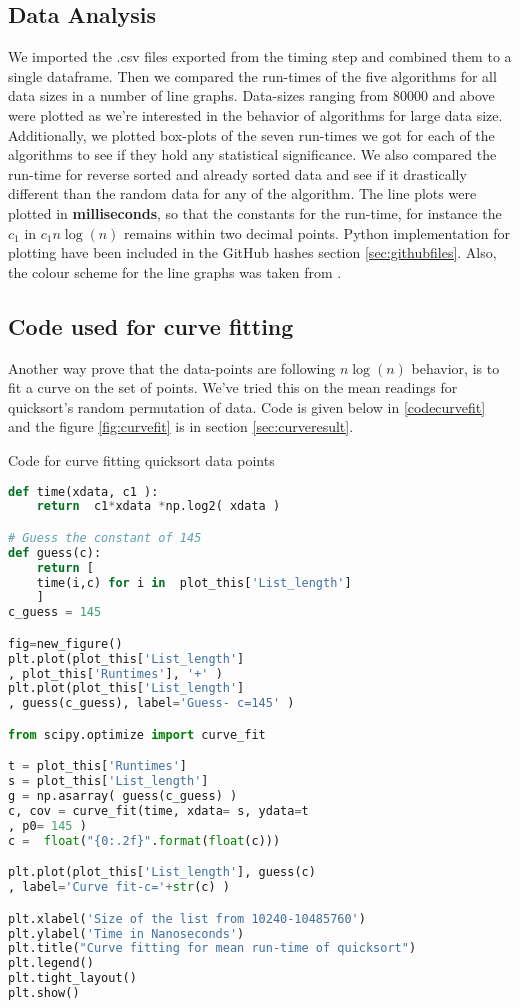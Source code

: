 \documentclass[sigconf, nonacm, natbib, screen, balance=False]{acmart}
\begin{document}
\subsection{Data Analysis}\label{sec:analysis}
We imported the .csv files exported from the timing step and combined them to a single dataframe. Then we compared the run-times of the five algorithms for all data sizes in a number of line graphs. Data-sizes ranging from 80000 and above were plotted as we're interested in the behavior of algorithms for large data size.\newline
Additionally, we plotted box-plots of the seven run-times we got for each of the algorithms to see if they hold any statistical significance. We also compared the run-time for reverse sorted and already sorted data and see if it drastically different than the random data for any of the algorithm. The line plots were plotted in \textbf{milliseconds}, so that the constants for the run-time, for instance the $c_1$ in  $c_1n\log\left(n\right)$ remains within two decimal points.\newline
Python implementation for plotting have been included in the GitHub hashes section \ref{sec:githubfiles}. Also, the colour scheme for the line graphs was taken from \citet{colorcombo}.

\subsection{Code used for curve fitting}\label{sec:curvefitting}
Another way prove that the data-points are following \textbf{$n\log(n)$} behavior, is to fit a curve on the set of points. We've tried this on the mean readings for quicksort's random permutation of data. Code is given below in \ref{codecurvefit} and the figure \ref{fig:curvefit} is in section \ref{sec:curveresult}.

\begin{listing}
  \caption{Code for curve fitting quicksort data points}
  \label{codecurvefit}
\begin{lstlisting}[language=Python]
def time(xdata, c1 ):
    return  c1*xdata *np.log2( xdata )

# Guess the constant of 145
def guess(c):
    return [ 
    time(i,c) for i in  plot_this['List_length']
    ]
c_guess = 145 

fig=new_figure()
plt.plot(plot_this['List_length']
, plot_this['Runtimes'], '+' )
plt.plot(plot_this['List_length']
, guess(c_guess), label='Guess- c=145' )

from scipy.optimize import curve_fit

t = plot_this['Runtimes']
s = plot_this['List_length']
g = np.asarray( guess(c_guess) )
c, cov = curve_fit(time, xdata= s, ydata=t
, p0= 145 )
c =  float("{0:.2f}".format(float(c)))

plt.plot(plot_this['List_length'], guess(c)
, label='Curve fit-c='+str(c) )

plt.xlabel('Size of the list from 10240-10485760')
plt.ylabel('Time in Nanoseconds')
plt.title("Curve fitting for mean run-time of quicksort")
plt.legend()
plt.tight_layout()
plt.show()
\end{lstlisting}
\end{listing}
\end{document}
